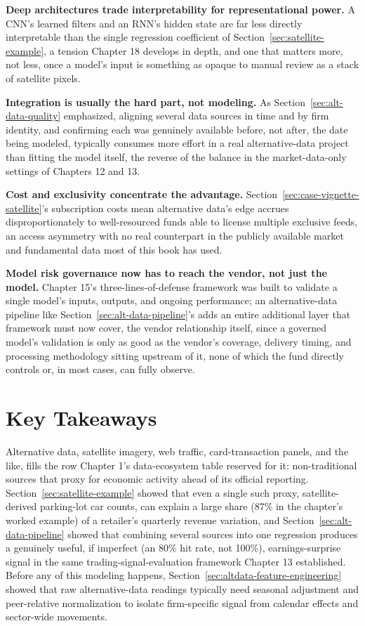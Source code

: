 \documentclass[../ai_in_finance]{subfiles}
\begin{document}
\textbf{Deep architectures trade interpretability for representational power.} A CNN's learned filters and an RNN's hidden state are far less directly interpretable than the single regression coefficient of Section~\ref{sec:satellite-example}, a tension Chapter 18 develops in depth, and one that matters more, not less, once a model's input is something as opaque to manual review as a stack of satellite pixels.

\textbf{Integration is usually the hard part, not modeling.} As Section~\ref{sec:alt-data-quality} emphasized, aligning several data sources in time and by firm identity, and confirming each was genuinely available before, not after, the date being modeled, typically consumes more effort in a real alternative-data project than fitting the model itself, the reverse of the balance in the market-data-only settings of Chapters 12 and 13.

\textbf{Cost and exclusivity concentrate the advantage.} Section~\ref{sec:case-vignette-satellite}'s subscription costs mean alternative data's edge accrues disproportionately to well-resourced funds able to license multiple exclusive feeds, an access asymmetry with no real counterpart in the publicly available market and fundamental data most of this book has used.

\textbf{Model risk governance now has to reach the vendor, not just the model.} Chapter 15's three-lines-of-defense framework was built to validate a single model's inputs, outputs, and ongoing performance; an alternative-data pipeline like Section~\ref{sec:alt-data-pipeline}'s adds an entire additional layer that framework must now cover, the vendor relationship itself, since a governed model's validation is only as good as the vendor's coverage, delivery timing, and processing methodology sitting upstream of it, none of which the fund directly controls or, in most cases, can fully observe.

\section{Key Takeaways}

Alternative data, satellite imagery, web traffic, card-transaction panels, and the like, fills the row Chapter 1's data-ecosystem table reserved for it: non-traditional sources that proxy for economic activity ahead of its official reporting. Section~\ref{sec:satellite-example} showed that even a single such proxy, satellite-derived parking-lot car counts, can explain a large share (87\% in the chapter's worked example) of a retailer's quarterly revenue variation, and Section~\ref{sec:alt-data-pipeline} showed that combining several sources into one regression produces a genuinely useful, if imperfect (an 80\% hit rate, not 100\%), earnings-surprise signal in the same trading-signal-evaluation framework Chapter 13 established. Before any of this modeling happens, Section~\ref{sec:altdata-feature-engineering} showed that raw alternative-data readings typically need seasonal adjustment and peer-relative normalization to isolate firm-specific signal from calendar effects and sector-wide movements.
\end{document}
